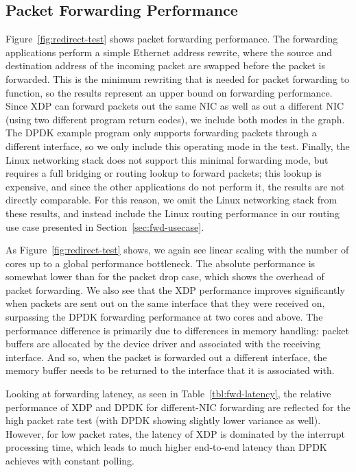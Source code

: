 \documentclass[sigconf]{acmart}
\begin{document}
\subsection{Packet Forwarding Performance}
\label{sec:pack-forw-perf}
Figure~\ref{fig:redirect-test} shows packet forwarding performance. The
forwarding applications perform a simple Ethernet address rewrite, where the
source and destination address of the incoming packet are swapped before the
packet is forwarded. This is the minimum rewriting that is needed for packet
forwarding to function, so the results represent an upper bound on forwarding
performance. Since XDP can forward packets out the same NIC as well as out a
different NIC (using two different program return codes), we include both modes
in the graph. The DPDK example program only supports forwarding packets through
a different interface, so we only include this operating mode in the test.
Finally, the Linux networking stack does not support this minimal forwarding
mode, but requires a full bridging or routing lookup to forward packets; this
lookup is expensive, and since the other applications do not perform it, the
results are not directly comparable. For this reason, we omit the Linux
networking stack from these results, and instead include the Linux routing
performance in our routing use case presented in Section~\ref{sec:fwd-usecase}.

As Figure~\ref{fig:redirect-test} shows, we again see linear scaling with the
number of cores up to a global performance bottleneck. The absolute performance
is somewhat lower than for the packet drop case, which shows the overhead of
packet forwarding. We also see that the XDP performance improves significantly
when packets are sent out on the same interface that they were received on,
surpassing the DPDK forwarding performance at two cores and above. The
performance difference is primarily due to differences in memory handling:
packet buffers are allocated by the device driver and associated with the
receiving interface. And so, when the packet is forwarded out a different
interface, the memory buffer needs to be returned to the interface that it is
associated with.

Looking at forwarding latency, as seen in Table~\ref{tbl:fwd-latency}, the
relative performance of XDP and DPDK for different-NIC forwarding are reflected
for the high packet rate test (with DPDK showing slightly lower variance as
well). However, for low packet rates, the latency of XDP is dominated by the
interrupt processing time, which leads to much higher end-to-end latency than
DPDK achieves with constant polling.
\end{document}
